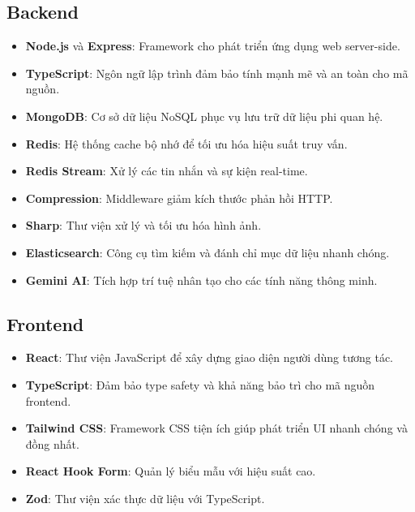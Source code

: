 \subsection{Backend}
\begin{itemize}
    \item \textbf{Node.js} và \textbf{Express}: Framework cho phát triển ứng dụng web server-side.
    \item \textbf{TypeScript}: Ngôn ngữ lập trình đảm bảo tính mạnh mẽ và an toàn cho mã nguồn.
    \item \textbf{MongoDB}: Cơ sở dữ liệu NoSQL phục vụ lưu trữ dữ liệu phi quan hệ.
    \item \textbf{Redis}: Hệ thống cache bộ nhớ để tối ưu hóa hiệu suất truy vấn.
    \item \textbf{Redis Stream}: Xử lý các tin nhắn và sự kiện real-time.
    \item \textbf{Compression}: Middleware giảm kích thước phản hồi HTTP.
    \item \textbf{Sharp}: Thư viện xử lý và tối ưu hóa hình ảnh.
    \item \textbf{Elasticsearch}: Công cụ tìm kiếm và đánh chỉ mục dữ liệu nhanh chóng.
    \item \textbf{Gemini AI}: Tích hợp trí tuệ nhân tạo cho các tính năng thông minh.
\end{itemize}

\subsection{Frontend}
\begin{itemize}
    \item \textbf{React}: Thư viện JavaScript để xây dựng giao diện người dùng tương tác.
    \item \textbf{TypeScript}: Đảm bảo type safety và khả năng bảo trì cho mã nguồn frontend.
    \item \textbf{Tailwind CSS}: Framework CSS tiện ích giúp phát triển UI nhanh chóng và đồng nhất.
    \item \textbf{React Hook Form}: Quản lý biểu mẫu với hiệu suất cao.
    \item \textbf{Zod}: Thư viện xác thực dữ liệu với TypeScript.
\end{itemize}